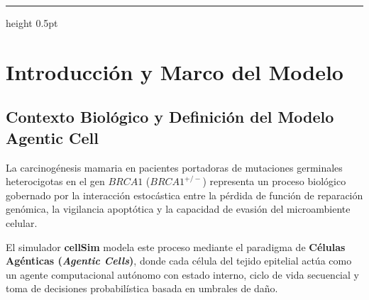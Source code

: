\documentclass[10pt,a4paper]{article}
\begin{document}
\vspace{1em}
\hrule height 0.5pt
\vspace{1.5em}

\section{Introducción y Marco del Modelo}

\subsection{Contexto Biológico y Definición del Modelo Agentic Cell}

La carcinogénesis mamaria en pacientes portadoras de mutaciones germinales heterocigotas en el gen $BRCA1$ ($BRCA1^{+/-}$) representa un proceso biológico gobernado por la interacción estocástica entre la pérdida de función de reparación genómica, la vigilancia apoptótica y la capacidad de evasión del microambiente celular.

El simulador \textbf{cellSim} modela este proceso mediante el paradigma de \textbf{Células Agénticas (\textit{Agentic Cells})}, donde cada célula del tejido epitelial actúa como un agente computacional autónomo con estado interno, ciclo de vida secuencial y toma de decisiones probabilística basada en umbrales de daño.
\end{document}

